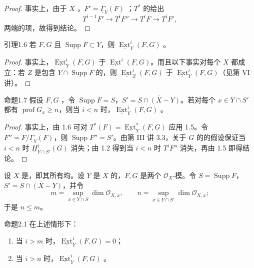 \begin{proof}
事实上，由于 $X$ ，$F'=\underline\Gamma_Y(F)$ ；$T^*$ 的给出
\[T^{i-1}F'\longrightarrow T^iF''\longrightarrow T^iF\longrightarrow T^iF',\]
两端的项，故得到结论。
\end{proof}
\begin{SGAresult}{引理}{1.6}
若 $F,G$ 且 $\operatorname{Supp}F\subset Y$，则 $\underline{\operatorname{Ext}}^i_Y(F,G)$ 。
\end{SGAresult}
\begin{proof}
事实上，$\underline{\operatorname{Ext}}^i_Y(F,G)$ 于 $\underline{\operatorname{Ext}}^i(F,G)$。而且以下事实对每个 $X$ 都成立：若 $Z$ 是包含 $Y\cap\operatorname{Supp}F$ 的，则 $\underline{\operatorname{Ext}}^i_Z(F,G)$ 于 $\underline{\operatorname{Ext}}^i_Y(F,G)$（见第 VI 讲）。
\end{proof}
\begin{SGAresult}{命题}{1.7}
假设 $F,G$ ，令 $\operatorname{Supp}F=S$，$S'=\overline{S\cap(X-Y)}$。若对每个 $x\in Y\cap S'$ 都有 $\operatorname{prof}G_x\geq n$，则当 $i<n$ 时，$\underline{\operatorname{Ext}}^i_Y(F,G)$ 。
\end{SGAresult}
\begin{proof}
事实上，由 1.6 可对 $T^*(F)=\underline{\operatorname{Ext}}^*_Y(F,G)$ 应用 1.5。令 $F''=F/\underline\Gamma_Y(F)$，则 $\operatorname{Supp}F''=S'$。由第 III 讲 3.3，关于 $G$ 的的假设保证当 $i<n$ 时 $\underline H^i_{Y\cap S'}(G)$ 消失；由 1.2 得到当 $i<n$ 时 $T^iF''$ 消失，再由 1.5 即得结论。
\end{proof}
设 $X$ 是，即其所有均。设 $Y$ 是 $X$ 的，$F,G$ 是两个 $\mathscr O_X$-模。令 $S=\operatorname{Supp}F$，$S'=\overline{S\cap(X-Y)}$，并令
\[
m=\sup_{x\in Y\cap S}\dim\mathscr O_{X,x},\qquad
n=\sup_{x\in Y\cap S'}\dim\mathscr O_{X,x};
\]
于是 $n\leq m$。
\begin{SGAresult}{命题}{2.1}
在上述情形下：
\begin{enumerate}
\item[(1)] 当 $i>m$ 时，$\underline{\operatorname{Ext}}^i_Y(F,G)=0$；
\item[(2)] 当 $i>n$ 时，$\underline{\operatorname{Ext}}^i_Y(F,G)$ 。
\end{enumerate}
\end{SGAresult}
